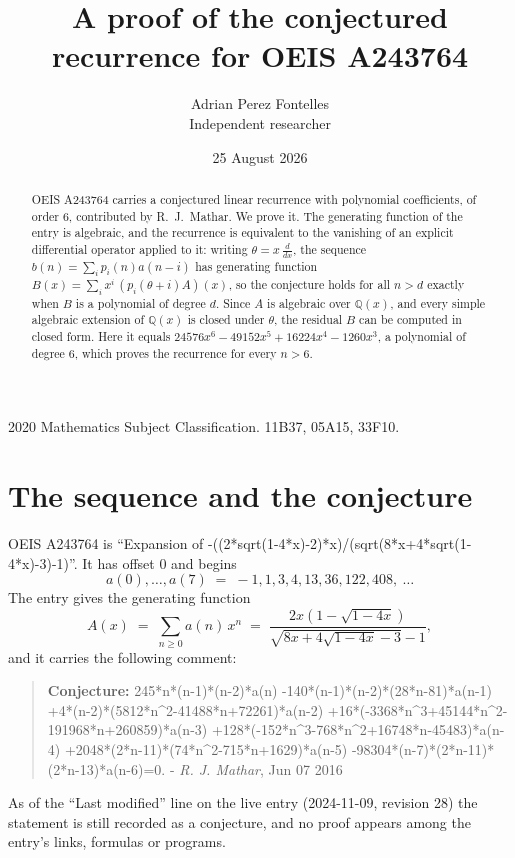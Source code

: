 \documentclass[11pt,a4paper]{article}
\title{A proof of the conjectured recurrence for OEIS A243764}
\author{Adrian Perez Fontelles\\ \small Independent researcher}
\date{25 August 2026}
\theoremstyle{plain}
\theoremstyle{definition}
\begin{document}
\maketitle

\begin{abstract}
OEIS A243764 carries a conjectured linear recurrence with polynomial coefficients, of
order 6, contributed by R.~J.~Mathar. We prove it. The generating function of the
entry is algebraic, and the recurrence is equivalent to the vanishing of an explicit
differential operator applied to it: writing $\theta=x\,\frac{d}{dx}$, the sequence
$b(n)=\sum_{i}p_{i}(n)a(n-i)$ has generating function
$B(x)=\sum_{i}x^{i}\,(p_{i}(\theta+i)A)(x)$, so the conjecture holds for all $n>d$ exactly
when $B$ is a polynomial of degree $d$. Since $A$ is algebraic over $\mathbb{Q}(x)$, and every simple
algebraic extension of $\mathbb{Q}(x)$ is closed under $\theta$, the residual $B$ can be
computed in closed form. Here it equals $24576 x^{6} - 49152 x^{5} + 16224 x^{4} - 1260 x^{3}$, a polynomial of degree $6$, which proves
the recurrence for every $n>6$.
\end{abstract}

\noindent\small 2020 Mathematics Subject Classification. 11B37, 05A15, 33F10.\normalsize

\section{The sequence and the conjecture}

OEIS A243764 is ``Expansion of -((2*sqrt(1-4*x)-2)*x)/(sqrt(8*x+4*sqrt(1-4*x)-3)-1)''. It has offset $0$ and begins
\[
a(0),\dots,a(7)\;=\;-1, 1, 3, 4, 13, 36, 122, 408,\ \dots
\]
The entry gives the generating function
\begin{equation}\label{eq:gf}
A(x)\;=\;\sum_{n\ge 0} a(n)\,x^{n}\;=\;\frac{2 x \left(1 - \sqrt{1 - 4 x}\right)}{\sqrt{8 x + 4 \sqrt{1 - 4 x} - 3} - 1} ,
\end{equation}
and it carries the following comment:
\begin{quote}\small
\textbf{Conjecture:} 245*n*(n-1)*(n-2)*a(n) -140*(n-1)*(n-2)*(28*n-81)*a(n-1) +4*(n-2)*(5812*n\^{}2-41488*n+72261)*a(n-2) +16*(-3368*n\^{}3+45144*n\^{}2-191968*n+260859)*a(n-3) +128*(-152*n\^{}3-768*n\^{}2+16748*n-45483)*a(n-4) +2048*(2*n-11)*(74*n\^{}2-715*n+1629)*a(n-5) -98304*(n-7)*(2*n-11)*(2*n-13)*a(n-6)=0. - \emph{R. J. Mathar}, Jun 07 2016
\end{quote}
As of the ``Last modified'' line on the live entry (2024-11-09, revision 28) the
statement is still recorded as a conjecture, and no proof appears among the entry's links,
formulas or programs.
\end{document}
